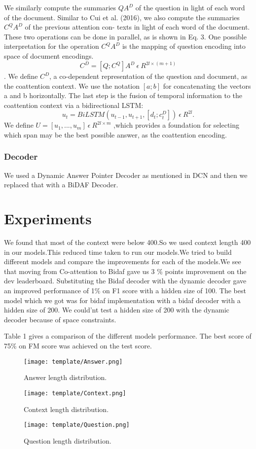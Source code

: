 \documentclass{article} %
\begin{document}
We similarly compute the summaries $QA^{D}$ of the question in light of each word of the document. Similar to Cui et al. (2016), we also compute the summaries $C^{Q}A^{D}$ of the previous attention con- texts in light of each word of the document. These two operations can be done in parallel, as is shown in Eq. 3. One possible interpretation for the operation $C^{Q}A^{D}$ is the mapping of question encoding into space of document encodings.
$$C^{D} = [Q;C^{Q}] A^{D} \ \epsilon \ R^{2l\times(m+1)}$$. We define $C^{D}$, a co-dependent representation of the question and document, as the coattention
context. We use the notation $[a; b]$ for concatenating the vectors a and b horizontally.
The last step is the fusion of temporal information to the coattention context via a bidirectional
LSTM: $$
u_{t} = BiLSTM ( u_{t−1}, u_{t+1},  [d_{t}; c^{D}_{t}])    \ \epsilon \  R^{2l}.$$ We define $U =[u_1,...,u_m]\ \epsilon \ R^{2l \times m} $ ,which provides a foundation for selecting which span may
be the best possible answer, as the coattention encoding.

\subsubsection{Decoder}
We used a Dynamic Answer Pointer Decoder as mentioned in DCN and then we replaced that with a BiDAF Decoder.

\section{Experiments}
We found that most of the context were below 400.So we used context length 400 in our models.This reduced time taken to run our models.We tried to build different models and compare the improvements for each of the models.We see that moving from Co-attention to Bidaf gave us 3 \% points improvement on the dev leaderboard. Substituting the Bidaf decoder with the dynamic decoder gave an improved performance of 1\% on F1 score with a hidden size of 100. The best model which we got was for bidaf implementation with a bidaf decoder with a hidden size of 200. We could'nt test a hidden size of 200 with the dynamic decoder because of space constraints.

Table 1 gives a comparison of the different models performance. The best score of 75\% on FM score was achieved on the test score.

\begin{figure}
  \texttt{[image: template/Answer.png]}
  \caption{Answer length distribution.}
\endminipage\hfill
{}
  \texttt{[image: template/Context.png]}
  \caption{Context length distribution.}
\endminipage\hfill
{}
  \texttt{[image: template/Question.png]}
  \caption{Question length distribution.}
\endminipage\hfill
\end{figure}
\end{document}
